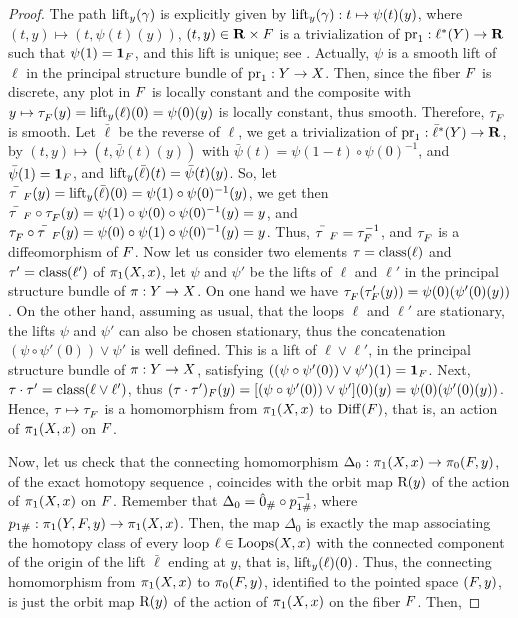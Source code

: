 \begin{proof}
  The path $\operatorname{lift}_y(\gamma)$ is explicitly given by $\operatorname{lift}_y(\gamma) : t \mapsto \psi(t)(y)$,
  where $(t,y) \mapsto (t,\psi(t)(y))$, $(t,y) \in {\mathbf R} \times F$ is a trivialization of $\mathrm{pr}_1 : \ell^*(Y) \to {\mathbf R}$ such that $\psi(1) = {\bf 1}_F$,
  and this lift is unique;
  see .
  Actually,
  $\psi$ is a smooth lift of $\ell$ in the principal structure bundle of $\mathrm{pr}_1 : Y \to X$.
  Then,
  since the fiber $F$ is discrete,
  any plot in $F$ is locally constant and the composite with $y \mapsto \vartau_\F(y) = \lift_y(\ell)(0) = \psi(0)(y)$ is locally constant,
  thus smooth.
  Therefore,
  $\vartau_\F$ is smooth.
  Let $\bar\ell$ be the reverse of $\ell$,
  we get a trivialization of $\mathrm{pr}_1 : \bar\ell^*(Y) \to {\mathbf R}$,
  by $(t,y) \mapsto (t,\bar\psi(t)(y))$ with $\bar\psi(t) = \psi(1-t)\circ\psi(0)^{-1}$,
  and $\bar\psi(1) = {\bf 1}_F$,
  and $\operatorname{lift}_y(\bar\ell)(t) = \bar\psi(t)(y)$.
  So,
  let $\bar\vartau_\F(y) = \lift_y(\bar\ell)(0) = \psi(1) \circ \psi(0)^{-1}(y)$,
  we get then $\bar\vartau_\F \circ \vartau_\F(y) = \psi(1) \circ \psi(0) \circ \psi(0)^{-1}(y) = y$,
  and $\vartau_\F \circ \bar\vartau_\F(y) = \psi(0) \circ \psi(1) \circ \psi(0)^{-1}(y) = y$.
  Thus,
  $\bar\vartau_\F = \tau_\F^{-1}$,
  and $\vartau_\F$ is a diffeomorphism of $F$.
  Now let us consider two elements $\tau = \operatorname{class}(\ell)$ and $\tau' = \operatorname{class}(\ell')$ of $\pi_1(X,x)$,
  let $\psi$ and $\psi'$ be the lifts of $\ell$ and $\ell'$ in the principal structure bundle of $\pi : Y \to X$.
  On one hand we have $\vartau_\F(\tau'_\F(y)) = \psi(0)(\psi'(0)(y))$.
  On the other hand,
  assuming as usual,
  that the loops $\ell$ and $\ell'$ are stationary,
  the lifts $\psi$ and $\psi'$ can also be chosen stationary,
  thus the concatenation $(\psi \circ \psi'(0)) \vee \psi'$ is well defined.
  This is a lift of $\ell \vee \ell'$,
  in the principal structure bundle of $\pi : Y \to X$,
  satisfying $((\psi \circ \psi'(0)) \vee \psi')(1)= {\bf 1}_F$.
  Next,
  $\tau \cdot \tau'= \operatorname{class}(\ell \vee \ell')$,
  thus $(\tau \cdot \tau')_F(y) = [(\psi \circ \psi'(0)) \vee \psi'](0)(y) = \psi(0)(\psi'(0)(y))$.
  Hence,
  $\tau \mapsto \vartau_\F$ is a homomorphism from $\pi_1(X,x)$ to $\mathrm{Diff}(F)$,
  that is,
  an action of $\pi_1(X,x)$ on $F$.
  
  Now,
  let us check that the connecting homomorphism $\Delta_0 : \pi_1(X,x) \to \pi_0(F,y)$,
  of the exact homotopy sequence ,
  coincides with the orbit map $\mathrm{R}(y)$ of the action of $\pi_1(X,x)$ on $F$.
  Remember that $\Delta_0 = \hat 0_\# \circ p_{1\#}^{-1}$,
  where $p_{1\#} : \pi_1(Y,F,y) \to \pi_1(X,x)$.
  Then,
  the map $\Delta_0$ is exactly the map associating the homotopy class of every loop $\ell \in \operatorname{Loops}(X,x)$ with the connected component of the origin of the lift $\bar\ell$ ending at $y$,
  that is,
  $\operatorname{lift}_y(\ell)(0)$.
  Thus,
  the connecting homomorphism from $\pi_1(X,x)$ to $\pi_0(F,y)$,
  identified to the pointed space $(F,y)$, is just the orbit map $\mathrm{R}(y)$ of the action of $\pi_1(X,x)$ on the fiber $F$.
  Then,
  

\end{proof}
